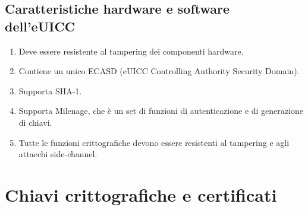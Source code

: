 \documentclass[10pt, twoside, openany]{book}
\begin{document}
\subsection{Caratteristiche hardware e software dell'eUICC}
\begin{enumerate}[itemsep=0pt]
\item Deve essere resistente al tampering dei componenti hardware.
\item Contiene un unico ECASD (eUICC Controlling Authority Security Domain).
\item Supporta SHA-1.
\item Supporta Milenage, che è un set di funzioni di autenticazione e di generazione di chiavi.
\item Tutte le funzioni crittografiche devono essere resistenti al tampering e agli attacchi side-channel.
\end{enumerate}

\section{Chiavi crittografiche e certificati}
\end{document}
